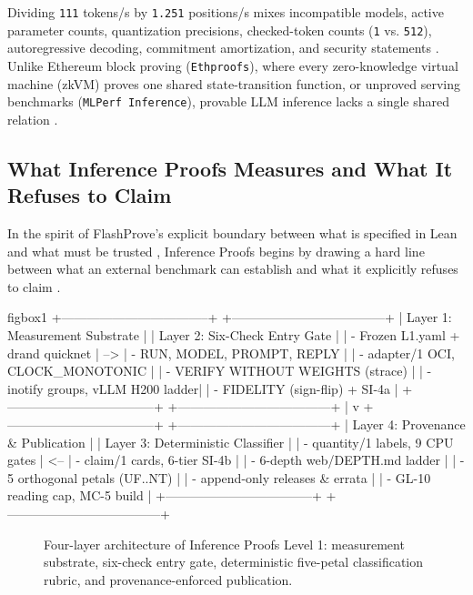 \documentclass[11pt,letterpaper]{article}
\begin{document}
Dividing \texttt{111} tokens/s by \texttt{1.251} positions/s mixes incompatible models, active parameter counts, quantization precisions, checked-token counts (\texttt{1} vs. \texttt{512}), autoregressive decoding, commitment amortization, and security statements \cite{iproofs2026}. Unlike Ethereum block proving (\texttt{Ethproofs}), where every zero-knowledge virtual machine (zkVM) proves one shared state-transition function, or unproved serving benchmarks (\texttt{MLPerf Inference}), provable LLM inference lacks a single shared relation \cite{iproofs2026}.

\subsection{What Inference Proofs Measures and What It Refuses to Claim}

In the spirit of FlashProve's explicit boundary between what is specified in Lean and what must be trusted \cite{rinberg2026flashprove}, Inference Proofs begins by drawing a hard line between what an external benchmark can establish and what it explicitly refuses to claim \cite{iproofs2026}.

\begin{SaveVerbatim}[fontsize=\scriptsize]{figbox1}
+-----------------------------------+     +------------------------------------+
| Layer 1: Measurement Substrate    |     | Layer 2: Six-Check Entry Gate      |
| - Frozen L1.yaml + drand quicknet | --> | - RUN, MODEL, PROMPT, REPLY        |
| - adapter/1 OCI, CLOCK_MONOTONIC  |     | - VERIFY WITHOUT WEIGHTS (strace)  |
| - inotify groups, vLLM H200 ladder|     | - FIDELITY (sign-flip) + SI-4a     |
+-----------------------------------+     +------------------------------------+
                                                             |
                                                             v
+-----------------------------------+     +------------------------------------+
| Layer 4: Provenance & Publication |     | Layer 3: Deterministic Classifier  |
| - quantity/1 labels, 9 CPU gates  | <-- | - claim/1 cards, 6-tier SI-4b      |
| - 6-depth web/DEPTH.md ladder     |     | - 5 orthogonal petals (UF..NT)     |
| - append-only releases & errata   |     | - GL-10 reading cap, MC-5 build    |
+-----------------------------------+     +------------------------------------+
\end{SaveVerbatim}
\begin{figure}[htbp]
\centering
\setlength{\fboxsep}{6pt}
\caption{Four-layer architecture of Inference Proofs Level 1: measurement substrate, six-check entry gate, deterministic five-petal classification rubric, and provenance-enforced publication.}
\label{fig:four-layer}
\end{figure}
\end{document}
